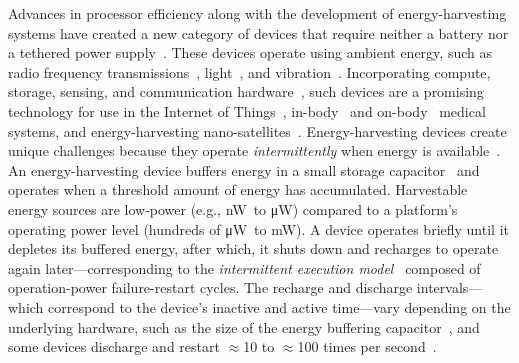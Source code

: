 Advances in processor efficiency along with the development of energy-harvesting systems have created a new category of devices that require neither a battery nor a tethered power supply~\cite{prasad_comst_2014,lucia_snapl_2017,soyata_csm_2016}. These devices operate using ambient energy, such as radio frequency transmissions~\cite{rf_powered_computing_gollakota_2014},
light~\cite{margolies_infocom_2016,margolies_tosn_2016}, and vibration~\cite{gorlatova_sigmetrics_2014}. Incorporating compute, storage, sensing, and communication hardware~\cite{wisp5,moo,capybara}, such devices are a promising technology for use in the Internet of Things~\cite{ku_cst_2016}, in-body~\cite{nadeau_naturebio_2017} and on-body~\cite{bandodkar_electroanalysis_2015} medical systems, and energy-harvesting nano-satellites~\cite{kicksat,capybara}. Energy-harvesting devices create unique challenges because they operate {\em intermittently} when energy is available~\cite{hicks_isca_2017,lucia_snapl_2017}. An energy-harvesting device buffers energy in a small storage capacitor~\cite{gorlatova_tmc_2013,gunduz_commag_2014} and operates when a threshold amount of energy has accumulated. Harvestable energy sources are low-power (e.g., \si{\nano\watt}\ to \si{\micro\watt}) compared to a platform's operating power level (hundreds of \si{\micro\watt}\ to \si{\milli\watt}). A device operates briefly until it depletes its buffered energy, after which, it shuts down and recharges to operate again later---corresponding to the {\em intermittent execution model}~\cite{dino,lucia_snapl_2017} composed of operation-power failure-restart cycles. The recharge and discharge intervals---which correspond to the device's inactive and active time---vary depending on the underlying hardware, such as the size of the energy buffering capacitor~\cite{capybara}, and some devices discharge and restart $\approx$10 to $\approx$100 times per second~\cite{tan_infocom_2016,mementos,nvp}.

